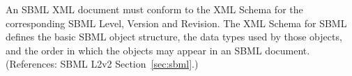 An SBML XML document must conform to the XML Schema for the corresponding
SBML Level, Version and Revision.  The XML Schema for SBML defines the basic
SBML object structure, the data types used by those objects, and the order
in which the objects may appear in an SBML document.  (References: SBML
L2v2 Section~\ref{sec:sbml}.)
